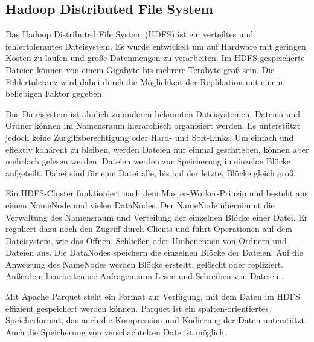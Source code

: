 \subsection{Hadoop Distributed File System}

Das Hadoop Distributed File System (HDFS) ist ein verteiltes und fehlertolerantes Dateisystem.
Es wurde entwickelt um auf Hardware mit geringen Kosten zu laufen und große Datenmengen zu verarbeiten.
Im HDFS gespeicherte Dateien können von einem Gigabyte bis mehrere Terabyte groß sein.
Die Fehlertoleranz wird dabei durch die Möglichkeit der Replikation mit einem beliebigen Faktor gegeben.

Das Dateisystem ist ähnlich zu anderen bekannten Dateisystemen.
Dateien und Ordner können im Namensraum hierarchisch organisiert werden.
Es unterstützt jedoch keine Zurgiffsberechtigung oder Hard- und Soft-Links.
Um einfach und effektiv kohärent zu bleiben, werden Dateien nur einmal geschrieben, können aber mehrfach gelesen werden.
Dateien werden zur Speicherung in einzelne Blöcke aufgeteilt.
Dabei sind für eine Datei alle, bis auf der letzte, Blöcke gleich groß.

Ein HDFS-Cluster funktioniert nach dem Master-Worker-Prinzip und besteht aus einem NameNode und vielen DataNodes.
Der NameNode übernimmt die Verwaltung des Namensraum und Verteilung der einzelnen Blöcke einer Datei.
Er reguliert dazu noch den Zugriff durch Clients und führt Operationen auf dem Dateisystem, wie das Öffnen, Schließen oder Umbenennen von Ordnern und Dateien aus.
Die DataNodes speichern die einzelnen Blöcke der Dateien.
Auf die Anweisung des NameNodes werden Blöcke ersteltt, gelöscht oder repliziert.
Außerdem bearbeiten sie Anfragen zum Lesen und Schreiben von Dateien \parencite{hdfs}.

Mit Apache Parquet steht ein Format zur Verfügung, mit dem Daten im HDFS effizient gespeichert werden können.
Parquet ist ein spalten-orientiertes Speicherformat, das auch die Kompression und Kodierung der Daten unterstützt.
Auch die Speicherung von verschachtelten Date ist möglich.
